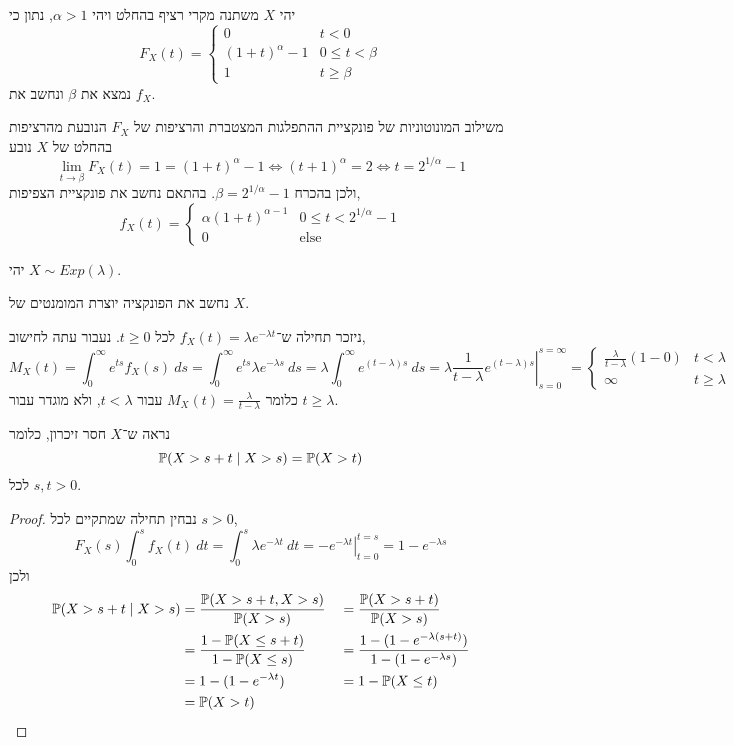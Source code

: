 \question{}
יהי $X$ משתנה מקרי רציף בהחלט ויהי $\alpha > 1$, נתון כי
\[
	F_X(t)
	= \begin{cases}
		0 & t < 0 \\
		{(1 + t)}^\alpha - 1 & 0 \le t < \beta \\
		1 & t \ge \beta
	\end{cases}
\]
נמצא את $\beta$ ונחשב את $f_X$.
\begin{solution}
	משילוב המונוטוניות של פונקציית ההתפלגות המצטברת והרציפות של $F_X$ הנובעת מהרציפות בהחלט של $X$ נובע
	\[
		\lim_{t \to \beta} F_X(t)
		= 1
		= {(1 + t)}^\alpha - 1
		\iff {(t + 1)}^\alpha = 2
		\iff t = 2^{1/\alpha} - 1
	\]
	ולכן בהכרח $\beta =  2^{1/\alpha} - 1$.
	בהתאם נחשב את פונקציית הצפיפות,
	\[
		f_X(t)
		= \begin{cases}
			\alpha {(1 + t)}^{\alpha - 1} & 0 \le t < 2^{1/\alpha} - 1 \\
			0 & \text{else}
		\end{cases}
	\]
\end{solution}

\question{}
יהי $X \sim Exp(\lambda)$.

\subquestion{}
נחשב את הפונקציה יוצרת המומנטים של $X$.
\begin{solution}
	ניזכר תחילה ש־$f_X(t) = \lambda e^{-\lambda t}$ לכל $t \ge 0$.
	נעבור עתה לחישוב,
	\[
		M_X(t)
		= \int_0^{\infty} e^{ts} f_X(s)\ ds
		= \int_0^{\infty} e^{ts} \lambda e^{-\lambda s}\ ds
		= \lambda \int_0^{\infty} e^{(t - \lambda) s}\ ds
		= \lambda \left. \frac{1}{t - \lambda} e^{(t - \lambda) s} \right\rvert_{s = 0}^{s = \infty}
		= \begin{cases}
			\frac{\lambda}{t - \lambda} (1 - 0) & t < \lambda \\
			\infty & t \ge \lambda
		\end{cases}
	\]
	כלומר $M_X(t) = \frac{\lambda}{t - \lambda}$ עבור $t < \lambda$, ולא מוגדר עבור $t \ge \lambda$.
\end{solution}

\subquestion{}
נראה ש־$X$ חסר זיכרון, כלומר
\[
	\mathbb{P}(X > s + t \mid X > s)
	= \mathbb{P}(X > t)
\]
לכל $s, t > 0$.
\begin{proof}
	נבחין תחילה שמתקיים לכל $s > 0$,
	\[
		F_X(s)
		\int_{0}^{s} f_X(t)\ dt
		= \int_{0}^{s} \lambda e^{-\lambda t}\ dt
		= \left. -e^{-\lambda t} \right\rvert_{t = 0}^{t = s}
		= 1 - e^{-\lambda s}
	\]
	ולכן
	\begin{align*}
		\mathbb{P}(X > s + t \mid X > s)
		& = \frac{\mathbb{P}(X > s + t, X > s)}{\mathbb{P}(X > s)}
		&& = \frac{\mathbb{P}(X > s + t)}{\mathbb{P}(X > s)} \\
		& = \frac{1 - \mathbb{P}(X \le s + t)}{1 - \mathbb{P}(X \le s)}
		&& = \frac{1 - (1 - e^{-\lambda (s + t)})}{1 - (1 - e^{-\lambda s})} \\
		& = 1 - (1 - e^{-\lambda t})
		&& = 1 - \mathbb{P}(X \le t) \\
		& = \mathbb{P}(X > t)
	\end{align*}
\end{proof}

